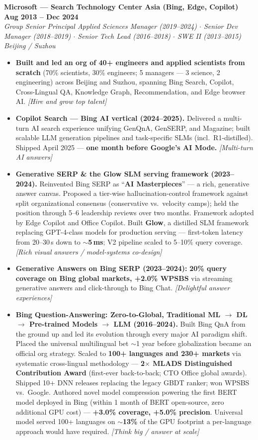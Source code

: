 \documentclass[10.5pt,letterpaper]{article}
\newcommand{\role}[4]{%
  \noindent\textbf{#1} \hfill \textbf{#3}\\
  \textit{#2} \hfill \textit{#4}\par\vspace{2pt}}
\newcommand{\lp}[1]{\textcolor{blue!55!black}{\small\textit{[#1]}}}
\begin{document}
\vspace{4pt}
\role{Microsoft --- Search Technology Center Asia (Bing, Edge, Copilot)}{Group Senior Principal Applied Sciences Manager (2019--2024) $\cdot$ Senior Dev Manager (2018--2019) $\cdot$ Senior Tech Lead (2016--2018) $\cdot$ SWE II (2013--2015)}{Aug 2013 -- Dec 2024}{Beijing / Suzhou}
\begin{itemize}
  \item \textbf{Built and led an org of 40+ engineers and applied scientists from scratch} (70\% scientists, 30\% engineers; 5 managers --- 3 science, 2 engineering) across Beijing and Suzhou, spanning Bing Search, Copilot, Cross-Lingual QA, Knowledge Graph, Recommendation, and Edge browser AI. \lp{Hire and grow top talent}
  \item \textbf{Copilot Search --- Bing AI vertical (2024--2025).} Delivered a multi-turn AI search experience unifying GenQnA, GenSERP, and Magazine; built scalable LLM generation pipelines and task-specific SLMs (incl.\ R1-distilled). Shipped April 2025 --- \textbf{one month before Google's AI Mode.} \lp{Multi-turn AI answers}
  \item \textbf{Generative SERP \& the Glow SLM serving framework (2023--2024).} Reinvented Bing SERP as ``\textbf{AI Masterpieces}'' --- a rich, generative answer canvas. Proposed a tier-wise hallucination-control framework against split organizational consensus (conservative vs.\ velocity camps); held the position through 5--6 leadership reviews over two months. Framework adopted by Edge Copilot and Office Copilot. Built \textbf{Glow}, a distilled SLM framework replacing GPT-4-class models for production serving --- first-token latency from 20--30\,s down to \textbf{$\sim$5\,ms}; V2 pipeline scaled to 5--10\% query coverage. \lp{Rich visual answers / model-systems co-design}
  \item \textbf{Generative Answers on Bing SERP (2023--2024):} \textbf{20\% query coverage on Bing global markets, +2.0\% WPSBS} via streaming generative answers and click-through to Bing Chat. \lp{Delightful answer experiences}
  \item \textbf{Bing Question-Answering: Zero-to-Global, Traditional ML $\to$ DL $\to$ Pre-trained Models $\to$ LLM (2016--2024).} Built Bing QnA from the ground up and led its evolution through every major AI paradigm shift. Placed the universal multilingual bet $\sim$1 year before globalization became an official org strategy. Scaled to \textbf{100+ languages and 230+ markets} via systematic cross-lingual methodology --- \textbf{2$\times$ MLADS Distinguished Contribution Award} (first-ever back-to-back; CTO Office global awards). Shipped 10+ DNN releases replacing the legacy GBDT ranker; won WPSBS vs.\ Google. Authored novel model compression powering the first BERT model deployed in Bing (within 1 month of BERT open-source, zero additional GPU cost) --- \textbf{+3.0\% coverage, +5.0\% precision}. Universal model served 100+ languages on \textbf{$\sim$13\%} of the GPU footprint a per-language approach would have required. \lp{Think big / answer at scale}

\end{itemize}
\end{document}
